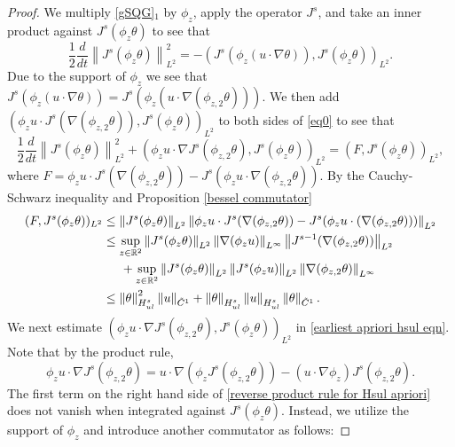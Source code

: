 \documentclass[12pt,xcolor=svgnames]{amsart}
\newcommand{\R}{\mathbb{R}}
\newcommand{\norm}[2]{\left\lVert#1\right\rVert_{#2}}
\begin{document}
\begin{proof}
We multiply \eqref{gSQG}$_1$ by $\phi_z$, apply the operator $J^s$, and take an inner product against $J^s(\phi_z \theta)$ to see that 
\begin{equation}
\label{eq0}
\frac{1}{2}\frac{d}{dt}\norm{J^s(\phi_z\theta)}{L^2}^2=- (J^s(\phi_z(u\cdot\nabla\theta)),J^s(\phi_z\theta))_{L^2}.
\end{equation}
Due to the support of $\phi_z$ we see that $J^s(\phi_z(u\cdot\nabla\theta))=J^s(\phi_z(u\cdot\nabla(\phi_{z,2}\theta)))$. We then add $(\phi_zu\cdot J^s(\nabla(\phi_{z,2}\theta)),J^s(\phi_z\theta))_{L^2}$ to both sides of \eqref{eq0} to see that 
\begin{equation}
\label{earliest apriori hsul eqn}
\frac{1}{2}\frac{d}{dt}\norm{J^s(\phi_z\theta)}{L^2}^2 + (\phi_z u \cdot \nabla J^s(\phi_{z,2}\theta),J^s(\phi_z \theta))_{L^2} = (F,J^s(\phi_z\theta))_{L^2},
\end{equation}
where $F= \phi_zu\cdot J^s(\nabla(\phi_{z,2}\theta))-J^s(\phi_zu\cdot\nabla(\phi_{z,2}\theta))$. By the Cauchy-Schwarz inequality and Proposition \ref{bessel commutator}
\begin{align*}
(F,J^s(\phi_z\theta))_{L^2}&\leq
\norm{J^s(\phi_z\theta)}{L^2}\norm{\phi_z u\cdot J^s(\nabla(\phi_{z,2}\theta))-J^s(\phi_zu\cdot(\nabla(\phi_{z,2}\theta)))}{L^2}\\
&\leq 
\sup_{z \in \R^2} \norm{J^s(\phi_z\theta)}{L^2} \norm{\nabla(\phi_zu)}{L^{\infty}}\norm{J^{s-1}(\nabla(\phi_{z,2}\theta))}{L^2}\\ &\hspace{.5cm}+\sup_{z \in \R^2} \norm{J^s(\phi_z\theta)}{L^2}\norm{J^s(\phi_z u)}{L^2}\norm{\nabla(\phi_{z,2}\theta)}{L^{\infty}}\\
&\leq
\norm{\theta}{H^s_{ul}}^2\norm{u}{\tilde{C}^1}+\norm{\theta}{H_{ul}^s}\norm{u}{H^s_{ul}}\norm{\theta}{\tilde{C}^1}.
\end{align*}
We next estimate $(\phi_z u \cdot \nabla J^s(\phi_{z,2}\theta),J^s(\phi_z \theta))_{L^2}$ in \eqref{earliest apriori hsul eqn}. Note that by the product rule,
\begin{equation}
\label{reverse product rule for Hsul apriori}
\phi_z u \cdot \nabla J^s(\phi_{z,2}\theta) = u\cdot\nabla(\phi_zJ^s(\phi_{z,2}\theta))-(u\cdot\nabla\phi_z)J^s(\phi_{z,2}\theta).
\end{equation}
The first term on the right hand side of \eqref{reverse product rule for Hsul apriori} does not vanish when integrated against $J^s(\phi_{z}\theta)$. Instead, we utilize the support of $\phi_z$ and introduce another commutator as follows:

\end{proof}
\end{document}
